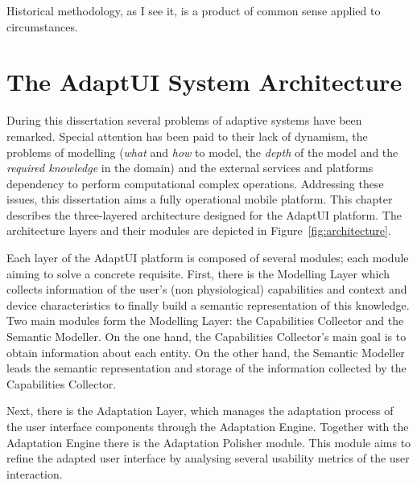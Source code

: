 
\begin{savequote}[50mm]
Historical methodology, as I see it, is a product of common sense applied to circumstances. 
\end{savequote}


\chapter{The AdaptUI System Architecture}
\label{cha:architecture}

\ifpdf
    \graphicspath{{4_system_architecture/figures/PNG/}{4_system_architecture/figures/PDF/}{4_system_architecture/figures/}}
\else
    \graphicspath{{4_system_architecture/figures/EPS/}{4_system_architecture/figures/}}
\fi

During this dissertation several problems of adaptive systems have been remarked.
Special attention has been paid to their lack of dynamism, the problems of 
modelling (\textit{what} and \textit{how} to model, the \textit{depth} of the 
model and the \textit{required knowledge} in the domain) and the external 
services and platforms dependency to perform computational complex operations. 
Addressing these issues, this dissertation aims a fully operational mobile 
platform. This chapter describes the three-layered architecture designed for 
the AdaptUI platform. The architecture layers and their modules are depicted in 
Figure~\ref{fig:architecture}.

Each layer of the AdaptUI platform is composed of several modules; each module
aiming to solve a concrete requisite. First, there is the Modelling Layer which
collects information of the user's (non physiological) capabilities and context
and device characteristics to finally build a semantic representation of this
knowledge. Two main modules form the Modelling Layer: the Capabilities Collector
and the Semantic Modeller. On the one hand, the Capabilities Collector's main
goal is to obtain information about each entity. On the other hand, the Semantic
Modeller leads the semantic representation and storage of the information
collected by the Capabilities Collector.

Next, there is the Adaptation Layer, which manages the adaptation process of the
user interface components through the Adaptation Engine. Together with the
Adaptation Engine there is the Adaptation Polisher module. This module aims to
refine the adapted user interface by analysing several usability metrics of the
user interaction.


